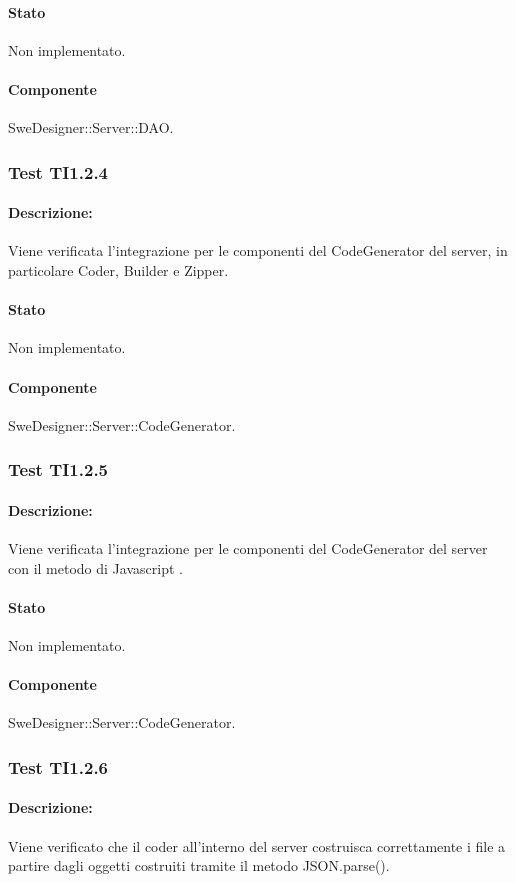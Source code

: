 \documentclass[../PianoDiQualifica.tex]{subfiles}
\begin{document}
	\paragraph{Stato} Non implementato.
	\paragraph{Componente} SweDesigner::Server::DAO.
	\subsubsection{Test TI1.2.4}
	\paragraph{Descrizione:} Viene verificata l'integrazione per le componenti del CodeGenerator del server, in particolare Coder, Builder e Zipper.
	\paragraph{Stato} Non implementato.
	\paragraph{Componente} SweDesigner::Server::CodeGenerator.
	
	\subsubsection{Test TI1.2.5}
	\paragraph{Descrizione:} Viene verificata l'integrazione per le componenti del CodeGenerator del server con il metodo di Javascript . %
	\paragraph{Stato} Non implementato.
	\paragraph{Componente} SweDesigner::Server::CodeGenerator.
	
	\subsubsection{Test TI1.2.6}
	\paragraph{Descrizione:} Viene verificato che il coder all'interno del server costruisca correttamente i file a partire dagli oggetti costruiti tramite il metodo JSON.parse().
\end{document}
